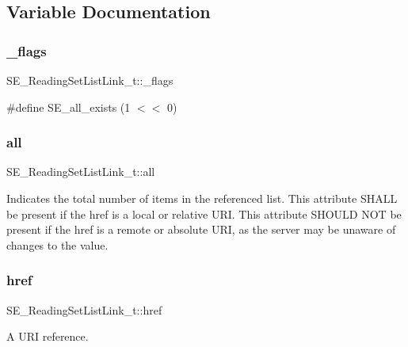 \subsection{Variable Documentation}
\mbox{\label{group__ReadingSetListLink_ga3d172a0c6b5174867353b4f36a430f0f}} 
\subsubsection{\texorpdfstring{\+\_\+flags}{\_flags}}
{\footnotesize\ttfamily S\+E\+\_\+\+Reading\+Set\+List\+Link\+\_\+t\+::\+\_\+flags}

\#define S\+E\+\_\+all\+\_\+exists (1 $<$$<$ 0) \mbox{\label{group__ReadingSetListLink_ga291434e7c08011bebfd4f6525890f6d6}} 
\subsubsection{\texorpdfstring{all}{all}}
{\footnotesize\ttfamily S\+E\+\_\+\+Reading\+Set\+List\+Link\+\_\+t\+::all}

Indicates the total number of items in the referenced list. This attribute S\+H\+A\+LL be present if the href is a local or relative U\+RI. This attribute S\+H\+O\+U\+LD N\+OT be present if the href is a remote or absolute U\+RI, as the server may be unaware of changes to the value. \mbox{\label{group__ReadingSetListLink_ga0ae032cf6c2098b273bc37628b88ac92}} 
\subsubsection{\texorpdfstring{href}{href}}
{\footnotesize\ttfamily S\+E\+\_\+\+Reading\+Set\+List\+Link\+\_\+t\+::href}

A U\+RI reference. 